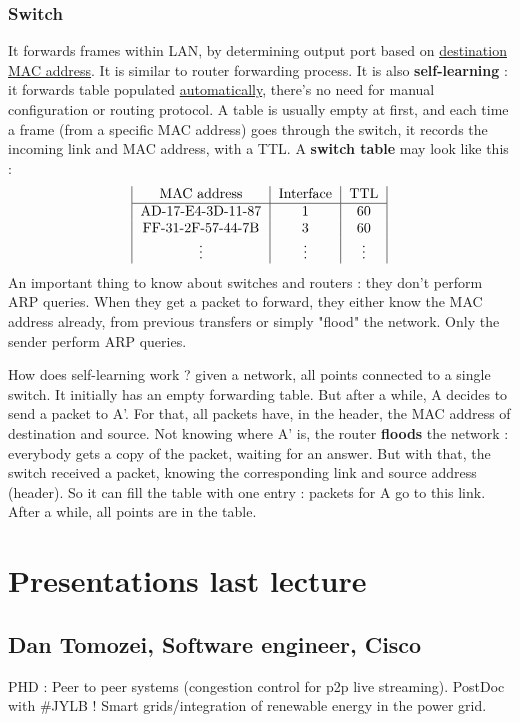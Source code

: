 \documentclass[12pt,a4paper]{article}
\begin{document}
\subsubsection{Switch}
It forwards frames within LAN, by determining output port based on \uline{destination MAC address}. It is similar to router forwarding process. It is also \textbf{self-learning} : it forwards table populated \uline{automatically}, there's no need for manual configuration or routing protocol. A table is usually empty at first, and each time a frame (from a specific MAC address) goes through the switch, it records the incoming link and MAC address, with a TTL. A \textbf{switch table} may look like this :
\[\begin{tabular}{|c|c|c|}
	\text{MAC address} & \text{Interface} & \text{TTL}\\
	\hline
	AD-17-E4-3D-11-87 & 1 & 60\\
	FF-31-2F-57-44-7B & 3 & 60\\
	\vdots & \vdots & \vdots
\end{tabular}\]
An important thing to know about switches and routers : they don't perform ARP queries. When they get a packet to forward, they either know the MAC address already, from previous transfers or simply "flood" the network. Only the sender perform ARP queries.
\begin{exemple}
	How does self-learning work ? given a network, all points connected to a single switch. It initially has an empty forwarding table. But after a while, A decides to send a packet to A'. For that, all packets have, in the header, the MAC address of destination and source. Not knowing where A' is, the router \textbf{floods} the network : everybody gets a copy of the packet, waiting for an answer. But with that, the switch received a packet, knowing the corresponding link and source address (header). So it can fill the table with one entry : packets for A go to this link. After a while, all points are in the table.
\end{exemple}


\section{Presentations last lecture}
\subsection{Dan Tomozei, Software engineer, Cisco}
PHD : Peer to peer systems (congestion control for p2p live streaming). PostDoc with \#JYLB ! Smart grids/integration of renewable energy in the power grid. 
\end{document}
